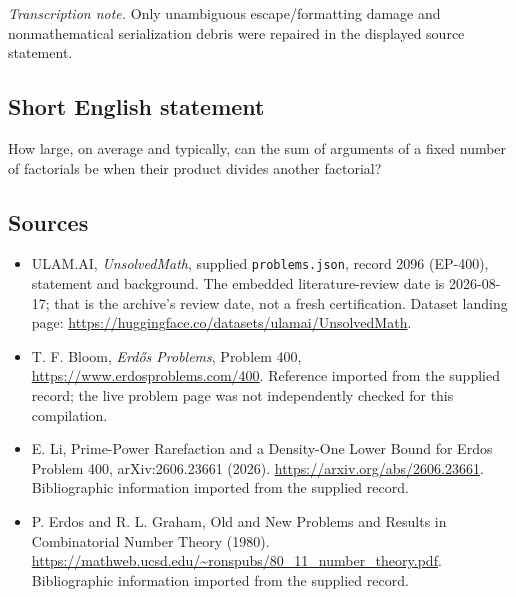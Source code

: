 \documentclass[11pt,a4paper]{article}
\begin{document}
{\small\emph{Transcription note.} Only unambiguous escape/formatting damage and nonmathematical serialization debris were repaired in the displayed source statement.}

\subsection{Short English statement}

How large, on average and typically, can the sum of arguments of a fixed number of factorials be when their product divides another factorial?

\subsection{Sources}

{\small

\begin{itemize}

\item[\hypertarget{source:2096:1}{S1}] ULAM.AI, \emph{UnsolvedMath}, supplied \texttt{problems.json}, record 2096 (EP-400), statement and background. The embedded literature-review date is 2026-08-17; that is the archive’s review date, not a fresh certification. Dataset landing page: \url{https://huggingface.co/datasets/ulamai/UnsolvedMath}.

\item[\hypertarget{source:2096:2}{S2}] T. F. Bloom, \emph{Erdős Problems}, Problem 400, \url{https://www.erdosproblems.com/400}. Reference imported from the supplied record; the live problem page was not independently checked for this compilation.

\item[\hypertarget{source:2096:3}{S3}] E. Li, Prime-Power Rarefaction and a Density-One Lower Bound for Erdos Problem 400, arXiv:2606.23661 (2026). \url{https://arxiv.org/abs/2606.23661}. Bibliographic information imported from the supplied record.

\item[\hypertarget{source:2096:4}{S4}] P. Erdos and R. L. Graham, Old and New Problems and Results in Combinatorial Number Theory (1980). \url{https://mathweb.ucsd.edu/~ronspubs/80_11_number_theory.pdf}. Bibliographic information imported from the supplied record.

\end{itemize}

}

\label{end:2096}
\end{document}
